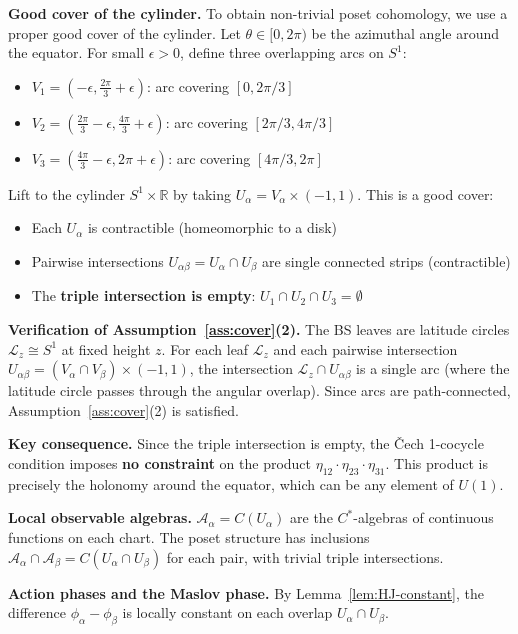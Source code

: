 \documentclass[11pt]{article}
\begin{document}
\textbf{Good cover of the cylinder.}
To obtain non-trivial poset cohomology, we use a proper good cover of the
cylinder. Let $\theta \in [0, 2\pi)$ be the azimuthal angle around the
equator. For small $\epsilon > 0$, define three overlapping arcs on $S^1$:
\begin{itemize}
\item $V_1 = (-\epsilon, \frac{2\pi}{3} + \epsilon)$: arc covering $[0, 2\pi/3]$
\item $V_2 = (\frac{2\pi}{3} - \epsilon, \frac{4\pi}{3} + \epsilon)$: arc covering $[2\pi/3, 4\pi/3]$
\item $V_3 = (\frac{4\pi}{3} - \epsilon, 2\pi + \epsilon)$: arc covering $[4\pi/3, 2\pi]$
\end{itemize}
Lift to the cylinder $S^1 \times \mathbb{R}$ by taking
$U_\alpha = V_\alpha \times (-1, 1)$. This is a good cover:
\begin{itemize}
\item Each $U_\alpha$ is contractible (homeomorphic to a disk)
\item Pairwise intersections $U_{\alpha\beta} = U_\alpha \cap U_\beta$ are
single connected strips (contractible)
\item The \textbf{triple intersection is empty}: $U_1 \cap U_2 \cap U_3 = \emptyset$
\end{itemize}

\textbf{Verification of Assumption~\ref{ass:cover}(2).}
The BS leaves are latitude circles $\mathcal{L}_z \cong S^1$ at fixed height $z$.
For each leaf $\mathcal{L}_z$ and each pairwise intersection
$U_{\alpha\beta} = (V_\alpha \cap V_\beta) \times (-1, 1)$,
the intersection $\mathcal{L}_z \cap U_{\alpha\beta}$ is a single arc
(where the latitude circle passes through the angular overlap).
Since arcs are path-connected, Assumption~\ref{ass:cover}(2) is satisfied.

\textbf{Key consequence.}
Since the triple intersection is empty, the Čech 1-cocycle condition
imposes \textbf{no constraint} on the product
$\eta_{12} \cdot \eta_{23} \cdot \eta_{31}$. This product is precisely
the holonomy around the equator, which can be any element of $U(1)$.

\textbf{Local observable algebras.}
$\mathcal{A}_\alpha = C(U_\alpha)$ are the $C^*$-algebras of continuous
functions on each chart. The poset structure has inclusions
$\mathcal{A}_\alpha \cap \mathcal{A}_\beta = C(U_\alpha \cap U_\beta)$
for each pair, with trivial triple intersections.

\textbf{Action phases and the Maslov phase.}
By Lemma~\ref{lem:HJ-constant}, the difference $\phi_\alpha - \phi_\beta$
is locally constant on each overlap $U_\alpha \cap U_\beta$.
\end{document}
